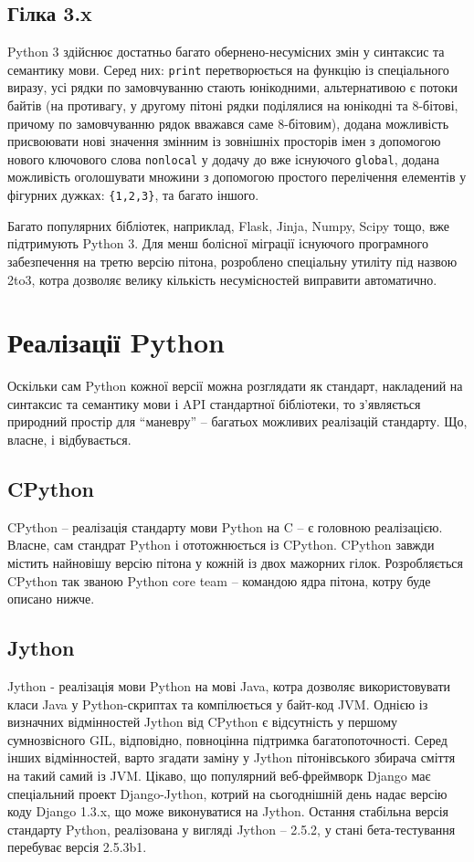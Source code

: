 \documentclass[a4paper, 12pt, onsedie]{article}
\begin{document}
\subsection{Гілка 3.x}
Python 3 здійснює достатньо багато обернено-несумісних змін у синтаксис та семантику мови.
Серед них: \texttt{print} перетворюється на функцію із спеціального виразу, усі рядки по
замовчуванню стають юнікодними, альтернативою є потоки байтів (на противагу, у другому
пітоні рядки поділялися на юнікодні та 8-бітові, причому по замовчуванню рядок вважався
саме 8-бітовим), додана можливість присвоювати нові значення змінним із зовнішніх просторів
імен з допомогою нового ключового слова \texttt{nonlocal} у додачу до вже існуючого 
\texttt{global}, додана можливість оголошувати множини з допомогою простого перелічення
елементів у фігурних дужках: \texttt{\{1,2,3\}}, та багато іншого.

Багато популярних бібліотек, наприклад, Flask, Jinja, Numpy, Scipy тощо, вже підтримують
Python 3. Для менш болісної міграції існуючого програмного забезпечення на третю версію
пітона, розроблено спеціальну утиліту під назвою 2to3, котра дозволяє велику кількість
несумісностей виправити автоматично.

\section{Реалізації Python}
Оскільки сам Python кожної версії можна розглядати як стандарт, накладений на синтаксис та
семантику мови і API стандартної бібліотеки, то з'являється природний простір для ``маневру''
 -- багатьох можливих реалізацій стандарту. Що, власне, і відбувається.

\subsection{CPython}
CPython -- реалізація стандарту мови Python на C -- є головною реалізацією. Власне, сам
стандрат Python і ототожнюється із CPython. CPython завжди містить найновішу версію пітона 
у кожній із двох мажорних гілок. Розробляється CPython так званою Python core team -- 
командою ядра пітона, котру буде описано нижче.


\subsection{Jython}
Jython - реалізація мови Python на мові Java, котра дозволяє використовувати класи Java у 
Python-скриптах та компілюється у байт-код JVM. Однією із визначних відмінностей Jython від
CPython є відсутність у першому сумнозвісного GIL, відповідно, повноцінна підтримка 
багатопоточності. Серед інших відмінностей, варто згадати заміну у Jython пітонівського 
збирача сміття на такий самий із JVM.
Цікаво, що популярний веб-фреймворк Django має спеціальний проект Django-Jython, котрий на
сьогоднішній день надає версію коду Django 1.3.x, що може виконуватися на Jython.
Остання стабільна версія стандарту Python, реалізована у вигляді Jython -- 2.5.2, у стані 
бета-тестування перебуває версія 2.5.3b1.
\end{document}
